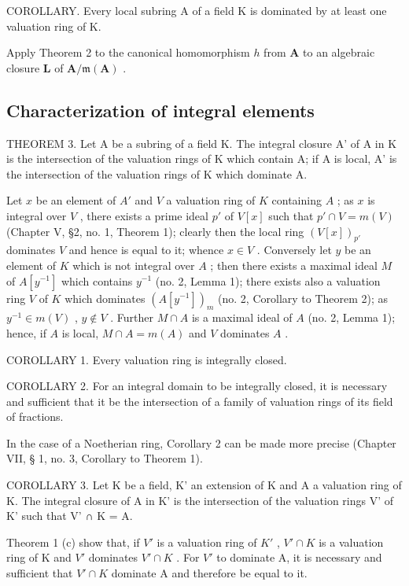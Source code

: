 COROLLARY. Every local subring A of a field K is dominated by at least one valuation ring of K.

Apply Theorem 2 to the canonical homomorphism \(h\) from \(\mathbf{A}\) to an algebraic closure \(\mathbf{L}\) of \(\mathbf{A} / \mathfrak{m}(\mathbf{A})\) .

\subsection{Characterization of integral elements}

THEOREM 3. Let A be a subring of a field K. The integral closure A' of A in K is the intersection of the valuation rings of K which contain A; if A is local, A' is the intersection of the valuation rings of K which dominate A.

Let \(x\) be an element of \(A'\) and \(V\) a valuation ring of \(K\) containing \(A\) ; as \(x\) is integral over \(V\) , there exists a prime ideal \(p'\) of \(V[x]\) such that \(p' \cap V = m(V)\) (Chapter V, §2, no. 1, Theorem 1); clearly then the local ring \((V[x])_{p'}\) dominates \(V\) and hence is equal to it; whence \(x \in V\) . Conversely let \(y\) be an element of \(K\) which is not integral over \(A\) ; then there exists a maximal ideal \(M\) of \(A[y^{-1}]\) which contains \(y^{-1}\) (no. 2, Lemma 1); there exists also a valuation ring \(V\) of \(K\) which dominates \((A[y^{-1}])_{m}\) (no. 2, Corollary to Theorem 2); as \(y^{-1} \in m(V)\) , \(y \notin V\) . Further \(M \cap A\) is a maximal ideal of \(A\) (no. 2, Lemma 1); hence, if \(A\) is local, \(M \cap A = m(A)\) and \(V\) dominates \(A\) .

COROLLARY 1. Every valuation ring is integrally closed.

COROLLARY 2. For an integral domain to be integrally closed, it is necessary and sufficient that it be the intersection of a family of valuation rings of its field of fractions.

In the case of a Noetherian ring, Corollary 2 can be made more precise (Chapter VII, § 1, no. 3, Corollary to Theorem 1).

COROLLARY 3. Let K be a field, K' an extension of K and A a valuation ring of K. The integral closure of A in K' is the intersection of the valuation rings V' of K' such that V' ∩ K = A.

Theorem 1 (c) show that, if \(V'\) is a valuation ring of \(K'\) , \(V' \cap K\) is a valuation ring of K and \(V'\) dominates \(V' \cap K\) . For \(V'\) to dominate A, it is necessary and sufficient that \(V' \cap K\) dominate A and therefore be equal to it.

